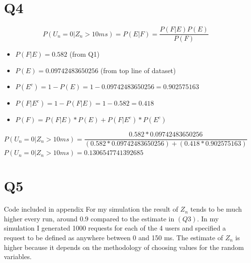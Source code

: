 \documentclass[a4paper,11pt]{article}
\theoremstyle{mytheor}
\begin{document}
\section*{Q4}
    $$ P(U_n=0|Z_n > 10ms) = P(E|F) = \frac{P(F|E)P(E)}{P(F)} $$
    \begin{itemize}
        \item $ P(F|E) = 0.582 $ (from Q1)
        \item $ P(E) = 0.09742483650256 $ (from top line of dataset)
        \item $ P(E^c) = 1-P(E) = 1-0.09742483650256 = 0.902575163 $
        \item $ P(F|E^c) = 1-P(F|E) = 1-0.582 = 0.418 $
        \item $ P(F) = P(F|E)*P(E) + P(F|E^c)*P(E^c) $
    \end{itemize}

    $$ P(U_n=0|Z_n > 10ms) = \frac{0.582 * 0.09742483650256}{(0.582 * 0.09742483650256)+(0.418*0.902575163)} $$
    $ P(U_n=0|Z_n > 10ms) = 0.1306547741392685 $

\section*{Q5}
    Code included in appendix
    For my simulation the result of $Z_n$ tends to be much higher every run,
    around $0.9$ compared to the estimate in $(Q3)$. In my simulation I generated 1000 requests
    for each of the 4 users and specified a request to be defined as 
    anywhere between 0 and 150 ms. The estimate of $Z_n$ is higher because it depends
    on the methodology of choosing values for the random variables. 
\end{document}
